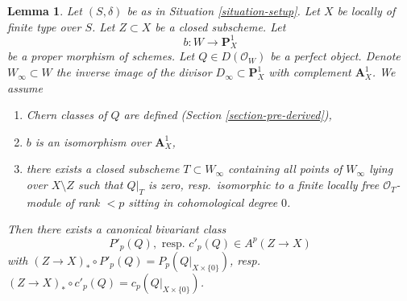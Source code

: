 \documentclass[10pt,a4paper]{amsart}
\theoremstyle{plain}
\newtheorem{lemma}[subsection]{Lemma}
\theoremstyle{definition}
\theoremstyle{remark}
\numberwithin{equation}{subsection}
\begin{document}
\begin{lemma}
\label{lemma-localized-chern-pre}
Let $(S, \delta)$ be as in Situation \ref{situation-setup}. Let $X$ be
locally of finite type over $S$. Let $Z \subset X$ be a closed subscheme.
Let
$$
b : W \longrightarrow \mathbf{P}^1_X
$$
be a proper morphism of schemes. Let $Q \in D(\mathcal{O}_W)$ be a
perfect object. Denote $W_\infty \subset W$ the inverse image of the divisor
$D_\infty \subset \mathbf{P}^1_X$ with complement $\mathbf{A}^1_X$.
We assume
\begin{enumerate}
\item[(A0)] Chern classes of $Q$ are defined
(Section \ref{section-pre-derived}),
\item[(A1)] $b$ is an isomorphism over $\mathbf{A}^1_X$,
\item[(A2)] there exists a closed subscheme $T \subset W_\infty$
containing all points of $W_\infty$ lying over $X \setminus Z$ such that
$Q|_T$ is zero, resp.\ isomorphic to a finite locally free
$\mathcal{O}_T$-module of rank $< p$ sitting in cohomological degree $0$.
\end{enumerate}
Then there exists a canonical bivariant class
$$
P'_p(Q),\text{ resp. }c'_p(Q) \in A^p(Z \to X)
$$
with
$(Z \to X)_* \circ P'_p(Q) = P_p(Q|_{X \times \{0\}})$,
resp.\ $(Z \to X)_* \circ c'_p(Q) = c_p(Q|_{X \times \{0\}})$.
\end{lemma}
\end{document}
